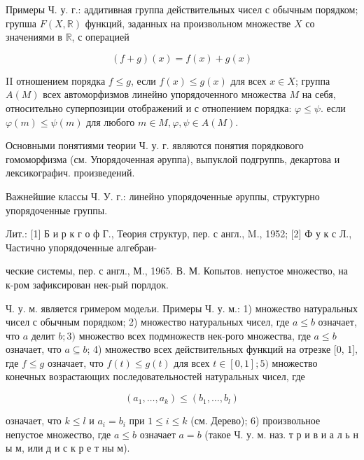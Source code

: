 \documentclass[10pt]{article}
\begin{document}
Примеры Ч. у. г.: аддитивная группа действительных чисел с обычным порядком; групша $F(X, \mathbb{R})$ функций, заданных на произвольном множестве $X$ со значениями в $\mathbb{R}$, с операцией



\[

(f+g)(x)=f(x)+g(x)

\]



II отношением порядка $f \leqslant g$, если $f(x) \leqslant g(x)$ для всех $x \in X$; группа $A(M)$ всех автоморфизмов линейно упорядоченного множества $M$ на себя, относительно суперпозиции отображений и с отнопением порядка: $\varphi \leqslant \psi$. если $\varphi(m) \leqslant \psi(m)$ для любого $m \in M, \varphi, \psi \in A(M)$.



Основными понятиями теории Ч. у. г. являются понятия порядкового гомоморфизма (см. Упорядоченная әруппа), выпуклой подгруппь, декартова и лексикографич. произведений.



Важнейшие классы Ч. У. г.: линейно упорядоченные әруппы, структурно упорядоченные группы.



Лит.: [1] Б и р к г о ф Г., Теория структур, пер. с англ., M., 1952; [2] Ф у к с Л., Частично упорядоченные алгебраи-



ческие системы, пер. с англ., М., 1965. В. М. Копытов. непустое множество, на к-ром зафиксирован нек-рый порлдок.



Ч. у. м. является гримером модељи. Примеры Ч. у. м.: 1) множество натуральных чисел с обычным порядком; 2) множество натуральных чисел, где $a \leqslant b$ означает, что $a$ делит $b ; 3)$ множество всех подмножеств нек-рого множества, где $a \leqslant b$ означает, что $a \subseteq b$; 4) множество всех действительных функций на отрезке [0, 1], где $f \leqslant g$ означает, что $f(t) \leqslant g(t)$ для всех $t \in[0,1] ; 5)$ множество конечных возрастающих последовательностей натуральных чисел, где



\[

\left(a_{1}, \ldots, a_{k}\right) \leqslant\left(b_{1}, \ldots, b_{l}\right)

\]



означает, что $k \leqslant l$ и $a_{i}=b_{i}$ при $1 \leqslant i \leqslant k$ (см. Дерево); 6) произвольное непустое множество, где $a \leqslant b$ означает $a=b$ (такое Ч. у. м. наз. т р и в и а л ь н ы м, или д и с к р е т ны м).
\end{document}
